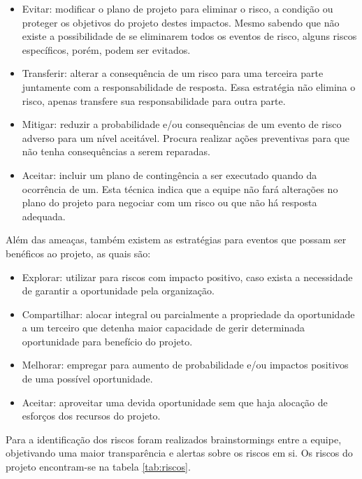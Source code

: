   \begin{itemize}
    \item Evitar: modificar o plano de projeto para eliminar o risco, a condição ou proteger os objetivos do projeto destes
    impactos. Mesmo sabendo que não existe a possibilidade de se eliminarem todos os eventos de risco, alguns riscos
    específicos, porém, podem ser evitados.
    \item Transferir: alterar a consequência de um risco para uma terceira parte juntamente com a responsabilidade de
    resposta. Essa estratégia não elimina o risco, apenas transfere sua responsabilidade para outra parte.
    \item Mitigar: reduzir a probabilidade e/ou consequências de um evento de risco adverso para um nível aceitável. Procura
    realizar ações preventivas para que não tenha consequências a serem reparadas.
    \item Aceitar: incluir um plano de contingência a ser executado quando da ocorrência de um. Esta técnica indica que a equipe
    não fará alterações no plano do projeto para negociar com um risco ou que não há resposta adequada.
  \end{itemize}

  Além das ameaças, também existem as estratégias para eventos que possam ser benéficos ao projeto, as quais são:

  \begin{itemize}
    \item Explorar: utilizar para riscos com impacto positivo, caso exista a necessidade de garantir a oportunidade pela organização.
    \item Compartilhar: alocar integral ou parcialmente a propriedade da oportunidade a um terceiro que detenha maior
    capacidade de gerir determinada oportunidade para benefício do projeto.
    \item Melhorar: empregar para aumento de probabilidade e/ou impactos positivos de uma possível oportunidade.
    \item Aceitar: aproveitar uma devida oportunidade sem que haja alocação de esforços dos recursos do projeto.
  \end{itemize}

  Para a identificação dos riscos foram realizados brainstormings entre a equipe, objetivando uma maior transparência
  e alertas sobre os riscos em si. Os riscos do projeto encontram-se na tabela \ref{tab:riscos}.


